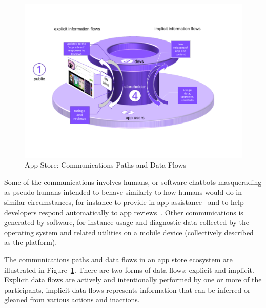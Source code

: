 \begin{figure}
    \includegraphics[width=\linewidth]{images/my/app-store-data-flows-3d.pdf}
    \caption{App Store: Communications Paths and Data Flows}
    \label{fig:app-store-data-flows}
\end{figure}

Some of the communications involves humans, or software chatbots masquerading as pseudo-humans intended to behave similarly to how humans would do in similar circumstances, for instance to provide in-app assistance~ and to help developers respond automatically to app reviews~. Other communications is generated by software, for instance usage and diagnostic data collected by the operating system and related utilities on a mobile device (collectively described as the platform).

The communications paths and data flows in an app store ecosystem are illustrated in Figure~\ref{fig:app-store-data-flows}. There are two forms of data flows: explicit and implicit. Explicit data flows are actively and intentionally performed by one or more of the participants, implicit data flows represents information that can be inferred or gleaned from various actions and inactions.

